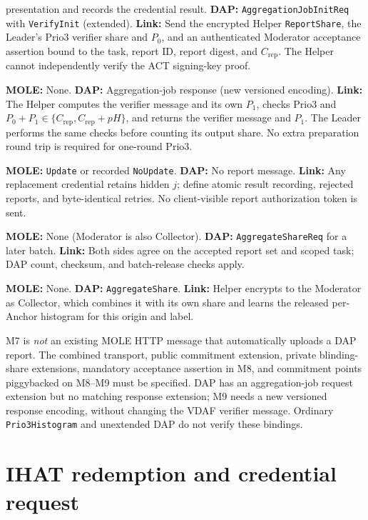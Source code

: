 \documentclass[11pt]{article}
\newcommand{\Crep}{C_{\mathrm{rep}}}
\begin{document}
\begin{description}
  presentation and records the credential result.
  \textbf{DAP:} \texttt{AggregationJobInitReq} with \texttt{VerifyInit}
  (extended). \textbf{Link:} Send the encrypted Helper
  \texttt{ReportShare}, the Leader's Prio3 verifier share and $P_0$, and
  an authenticated Moderator acceptance assertion bound to the task,
  report ID, report digest, and $\Crep$. The Helper cannot independently
  verify the ACT signing-key proof.
\item[M9: Helper--Moderator.] \textbf{MOLE:} None.
  \textbf{DAP:} Aggregation-job response (new versioned encoding).
  \textbf{Link:} The Helper computes the verifier message and its own
  $P_1$, checks Prio3 and $P_0+P_1\in\{\Crep,\Crep+pH\}$, and returns
  the verifier message and $P_1$. The Leader performs the same checks
  before counting its output share. No extra preparation round trip is
  required for one-round Prio3.
\item[M10: Moderator--Client.] \textbf{MOLE:} \texttt{Update} or recorded
  \texttt{NoUpdate}. \textbf{DAP:} No report message.
  \textbf{Link:} Any replacement credential retains hidden $j$; define
  atomic result recording, rejected reports, and byte-identical retries.
  No client-visible report authorization token is sent.
\item[M11: Moderator--Helper.] \textbf{MOLE:} None (Moderator is also
  Collector). \textbf{DAP:} \texttt{AggregateShareReq} for a later batch.
  \textbf{Link:} Both sides agree on the accepted report set and scoped
  task; DAP count, checksum, and batch-release checks apply.
\item[M12: Helper--Moderator.] \textbf{MOLE:} None.
  \textbf{DAP:} \texttt{AggregateShare}.
  \textbf{Link:} Helper encrypts to the Moderator as Collector, which
  combines it with its own share and learns the
  released per-Anchor histogram for this origin and label.
\end{description}

M7 is \emph{not} an existing MOLE HTTP message that automatically uploads a
DAP report. The combined transport, public commitment extension, private
blinding-share extensions, mandatory acceptance assertion in M8, and
commitment points piggybacked on M8--M9 must be specified. DAP has an
aggregation-job request extension but no matching response extension;
M9 needs a new versioned response encoding, without changing the VDAF
verifier message. Ordinary
\texttt{Prio3Histogram} and unextended DAP do not verify these bindings.

\section{IHAT redemption and credential request}
\end{document}
